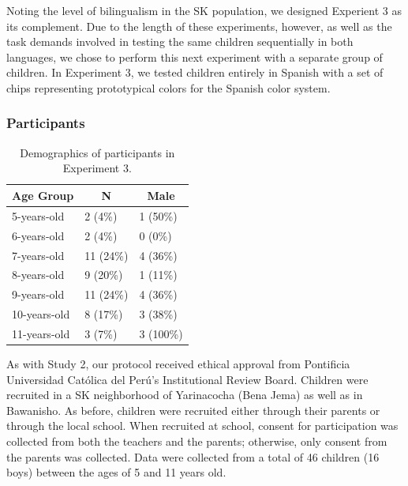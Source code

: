 \documentclass[,man,floatsintext]{apa6}
\theoremstyle{definition}
\theoremstyle{definition}
\theoremstyle{definition}
\theoremstyle{remark}
\begin{document}
Noting the level of bilingualism in the SK population, we designed
Experient 3 as its complement. Due to the length of these experiments,
however, as well as the task demands involved in testing the same
children sequentially in both languages, we chose to perform this next
experiment with a separate group of children. In Experiment 3, we tested
children entirely in Spanish with a set of chips representing
prototypical colors for the Spanish color system.

\subsubsection{Participants}\label{participants-2}

\begin{table}[tbp]
\begin{center}
\begin{threeparttable}
\caption{\label{tab:unnamed-chunk-5}Demographics of participants in Experiment 3.}
\begin{tabular}{lll}
\toprule
Age Group & \multicolumn{1}{c}{N} & \multicolumn{1}{c}{Male}\\
\midrule
5-years-old & 2 (4\%) & 1 (50\%)\\
6-years-old & 2 (4\%) & 0 (0\%)\\
7-years-old & 11 (24\%) & 4 (36\%)\\
8-years-old & 9 (20\%) & 1 (11\%)\\
9-years-old & 11 (24\%) & 4 (36\%)\\
10-years-old & 8 (17\%) & 3 (38\%)\\
11-years-old & 3 (7\%) & 3 (100\%)\\
\bottomrule
\end{tabular}
\end{threeparttable}
\end{center}
\end{table}

As with Study 2, our protocol received ethical approval from Pontificia
Universidad Católica del Perú's Institutional Review Board. Children
were recruited in a SK neighborhood of Yarinacocha (Bena Jema) as well
as in Bawanisho. As before, children were recruited either through their
parents or through the local school. When recruited at school, consent
for participation was collected from both the teachers and the parents;
otherwise, only consent from the parents was collected. Data were
collected from a total of 46 children (16 boys) between the ages of 5
and 11 years old.
\end{document}
